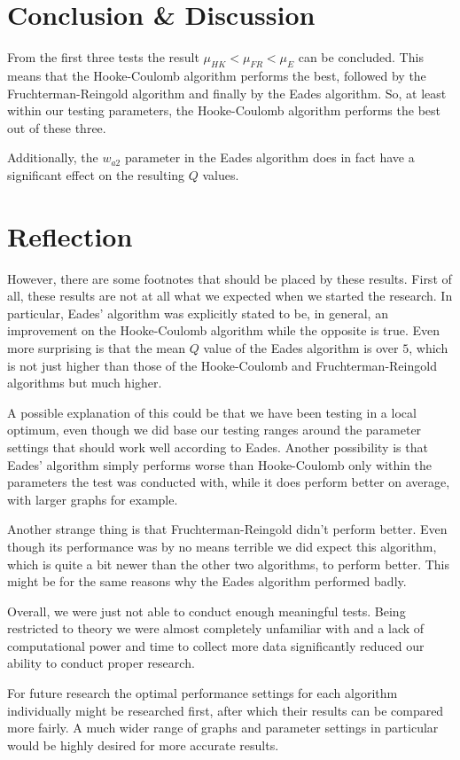 \documentclass[a4paper,12pt]{article}
\begin{document}
  \section{Conclusion \& Discussion}
  From the first three tests the result $\mu_{HK} < \mu_{FR} < \mu_{E}$ can be concluded. This means that the Hooke-Coulomb algorithm performs the best, followed by the Fruchterman-Reingold algorithm and finally by the Eades algorithm. So, at least within our testing parameters, the Hooke-Coulomb algorithm performs the best out of these three.
  
  Additionally, the $w_{a2}$ parameter in the Eades algorithm does in fact have a significant effect on the resulting $Q$ values.
  
  \section{Reflection}
  However, there are some footnotes that should be placed by these results.
  First of all, these results are not at all what we expected when we started the research. In particular, Eades' algorithm was explicitly stated to be, in general, an improvement on the Hooke-Coulomb algorithm while the opposite is true. Even more surprising is that the mean $Q$ value of the Eades algorithm is over $5$, which is not just higher than those of the Hooke-Coulomb and Fruchterman-Reingold algorithms but much higher.
  
  A possible explanation of this could be that we have been testing in a local optimum, even though we did base our testing ranges around the parameter settings that should work well according to Eades. Another possibility is that Eades' algorithm simply performs worse than Hooke-Coulomb only within the parameters the test was conducted with, while it does perform better on average, with larger graphs for example.
  
  Another strange thing is that Fruchterman-Reingold didn't perform better. Even though its performance was by no means terrible we did expect this algorithm, which is quite a bit newer than the other two algorithms, to perform better. This might be for the same reasons why the Eades algorithm performed badly.
  
  Overall, we were just not able to conduct enough meaningful tests. Being restricted to theory we were almost completely unfamiliar with and a lack of computational power and time to collect more data significantly reduced our ability to conduct proper research.
  
  For future research the optimal performance settings for each algorithm individually might be researched first, after which their results can be compared more fairly. A much wider range of graphs and parameter settings in particular would be highly desired for more accurate results.

  {}
  
\end{document}
